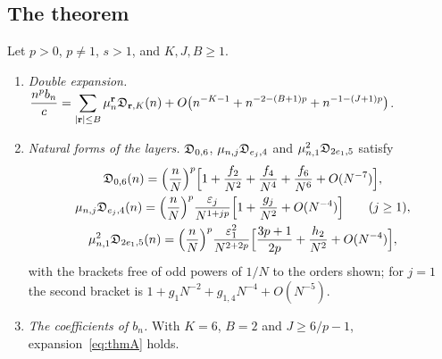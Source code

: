 \subsection{The theorem}\label{sec:N6}
\begin{theorem}\label{thm:N6}
Let $p>0$, $p\ne1$, $s>1$, and $K,J,B\ge1$.
\begin{enumerate}
\item[(i)] \emph{Double expansion.} $\displaystyle\frac{n^pb_n}c=\sum_{|\mathbf r|\le B}\mu_n^{\mathbf r}\mathfrak D_{\mathbf r,K}(n)
  +O\bigl(n^{-K-1}+n^{-2-(B+1)p}+n^{-1-(J+1)p}\bigr)$.
\item[(ii)] \emph{Natural forms of the layers.} $\mathfrak D_{0,6}$, $\mu_{n,j}\mathfrak D_{e_j,4}$ and $\mu_{n,1}^2\mathfrak D_{2e_1,5}$ satisfy
\begin{gather*}
  \mathfrak D_{0,6}(n)=\Bigl(\frac nN\Bigr)^p\Bigl[1+\frac{f_2}{N^2}+\frac{f_4}{N^4}+\frac{f_6}{N^6}+O(N^{-7})\Bigr],\\
  \mu_{n,j}\mathfrak D_{e_j,4}(n)=\Bigl(\frac nN\Bigr)^p\frac{\varepsilon_j}{N^{1+jp}}\Bigl[1+\frac{g_j}{N^2}+O(N^{-4})\Bigr]\qquad(j\ge1),\\
  \mu_{n,1}^2\mathfrak D_{2e_1,5}(n)=\Bigl(\frac nN\Bigr)^p\frac{\varepsilon_1^2}{N^{2+2p}}\Bigl[\frac{3p+1}{2p}+\frac{h_2}{N^2}+O(N^{-4})\Bigr],
\end{gather*}
with the brackets free of odd powers of $1/N$ to the orders shown; for $j=1$ the second bracket is
$1+g_1N^{-2}+g_{1,4}N^{-4}+O(N^{-5})$.
\item[(iii)] \emph{The coefficients of $b_n$.} With $K=6$, $B=2$ and $J\ge6/p-1$, expansion~\eqref{eq:thmA} holds.
\end{enumerate}
\end{theorem}

